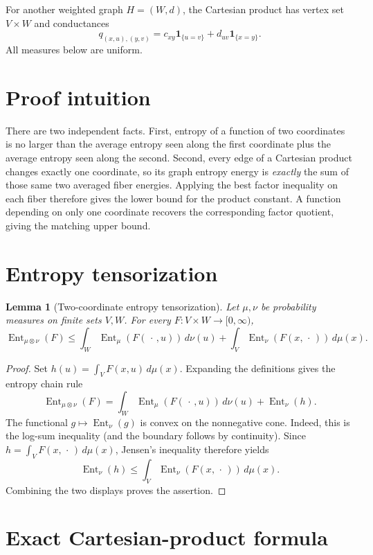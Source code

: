 \documentclass[11pt]{article}
\newtheorem{lemma}{Lemma}
\newcommand{\Ent}{\operatorname{Ent}}
\begin{document}
For another weighted graph \(H=(W,d)\), the Cartesian product has vertex
set \(V\times W\) and conductances
\[
 q_{(x,u),(y,v)}
 =c_{xy}\mathbf 1_{\{u=v\}}
  +d_{uv}\mathbf 1_{\{x=y\}}.
\]
All measures below are uniform.

\section{Proof intuition}

There are two independent facts.  First, entropy of a function of two
coordinates is no larger than the average entropy seen along the first
coordinate plus the average entropy seen along the second.  Second, every
edge of a Cartesian product changes exactly one coordinate, so its graph
entropy energy is \emph{exactly} the sum of those same two averaged fiber
energies.  Applying the best factor inequality on each fiber therefore gives
the lower bound for the product constant.  A function depending on only one
coordinate recovers the corresponding factor quotient, giving the matching
upper bound.

\section{Entropy tensorization}

\begin{lemma}[Two-coordinate entropy tensorization]
Let \(\mu,\nu\) be probability measures on finite sets \(V,W\).  For every
\(F:V\times W\to[0,\infty)\),
\[
 \Ent_{\mu\otimes\nu}(F)
 \leq
 \int_W \Ent_\mu(F(\,\cdot\,,u))\,d\nu(u)
 +\int_V \Ent_\nu(F(x,\,\cdot\,))\,d\mu(x).
\]
\end{lemma}

\begin{proof}
Set \(h(u)=\int_V F(x,u)\,d\mu(x)\).  Expanding the definitions gives the
entropy chain rule
\[
 \Ent_{\mu\otimes\nu}(F)
 =
 \int_W\Ent_\mu(F(\,\cdot\,,u))\,d\nu(u)
 +\Ent_\nu(h).
\]
The functional \(g\mapsto\Ent_\nu(g)\) is convex on the nonnegative cone.
Indeed, this is the log-sum inequality (and the boundary follows by
continuity).  Since \(h=\int_V F(x,\,\cdot\,)\,d\mu(x)\), Jensen's inequality
therefore yields
\[
  \Ent_\nu(h)
  \leq\int_V\Ent_\nu(F(x,\,\cdot\,))\,d\mu(x).
\]
Combining the two displays proves the assertion.
\end{proof}

\section{Exact Cartesian-product formula}
\end{document}
